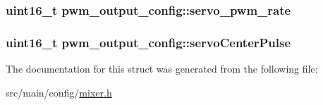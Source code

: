 \hypertarget{structpwm__output__config_a7d131c7364cdacf0d6e182b2a51ab20f}{
\subsubsection[{servo\+\_\+pwm\+\_\+rate}]{\setlength{\rightskip}{0pt plus 5cm}uint16\+\_\+t pwm\+\_\+output\+\_\+config\+::servo\+\_\+pwm\+\_\+rate}}\label{structpwm__output__config_a7d131c7364cdacf0d6e182b2a51ab20f}
\hypertarget{structpwm__output__config_a00519b4e47c37267efae50d05459276d}{
\subsubsection[{servo\+Center\+Pulse}]{\setlength{\rightskip}{0pt plus 5cm}uint16\+\_\+t pwm\+\_\+output\+\_\+config\+::servo\+Center\+Pulse}}\label{structpwm__output__config_a00519b4e47c37267efae50d05459276d}


The documentation for this struct was generated from the following file\+:\begin{DoxyCompactItemize}
\item 
src/main/config/\hyperlink{config_2mixer_8h}{mixer.\+h}\end{DoxyCompactItemize}
